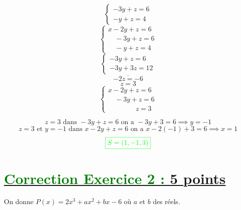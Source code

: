 \documentclass[12pt,a4paper]{article}
\begin{document}
\begin{enumerate}
    \[
\begin{cases}
        -3y+z=6 \\
        -y+z=4
    \end{cases}
    \]
        \[
    \begin{cases}
        x - 2y + z = 6 \\
        \quad -3y+z=6 \\
        \quad -y+z=4
    \end{cases}
    \]
    \[
\underline{    \begin{cases}
        -3y+z=6 \\
        -3y+3z=12
    \end{cases}}
    \]
    \[-2z=-6\]
    \[z=3\]
    \[
    \begin{cases}
        x - 2y + z = 6 \\
        \quad -3y+z=6 \\
        \quad\quad\quad\quad z=3
    \end{cases}
    \]
    
    \[z=3 \text{ dans } -3y+z=6  \text{ on a } -3y+3=6 \implies y=-1\]
    \[\text{$z=3 $ et $y=-1$ dans } x - 2y + z = 6  \text{ on a } x - 2(-1) + 3 = 6 \implies x=1\]
\[
\textcolor{green}{\boxed{S = (1,-1,3)   }} 
\]
\end{enumerate}

\section*{\underline{\textcolor{green}{Correction Exercice 2 :} 5 points}}

On donne \( P(x) = 2x^3 + ax^2 + bx - 6 \) où \( a \) et \( b \) des réels.
\end{document}
